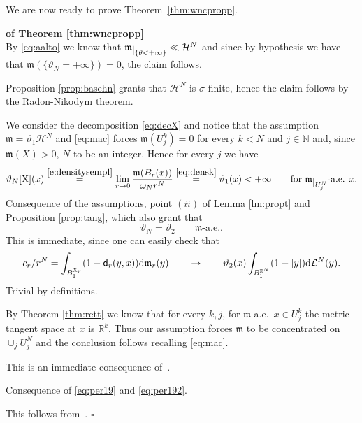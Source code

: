 \documentclass[reqno,11pt]{article}
\numberwithin{equation}{section}
\newcommand{\N}{\mathbb{N}}
\newcommand{\R}{\mathbb{R}}
\newcommand{\mm}{{\mbox{\boldmath$m$}}}
\newcommand{\sfd}{{\sf d}}
\renewcommand{\d}{{\mathrm d}}
\newcommand{\restr}[1]{\lower3pt\hbox{$|_{#1}$}}
\renewcommand{\mm}{\mathfrak m}                                %
\newenvironment{proofb}{\removelastskip\par\medskip   %
\noindent{\em{\bf Proof}} \rm}{\penalty-20\null\hfill$\square$\par\medbreak}
\newcommand{\X}{{\rm X}}
\newcommand{\HH}{{\mathcal H}}
\newcommand{\LL}{{\mathcal L}}
\begin{document}
We are now ready to prove Theorem~\ref{thm:wncpropp}.
\begin{proofb}{\bf of Theorem \ref{thm:wncpropp}}\\
 By \eqref{eq:aalto} we know that $\mm\restr{\{\theta<+\infty\}}\ll\HH^N$ and since by hypothesis we have that $\mm(\{\vartheta_N=+\infty\})=0$, the claim follows. 

 Proposition \ref{prop:basehn} grants that $\HH^N$ is $\sigma$-finite, hence the claim follows by the Radon-Nikodym theorem.

 We consider the decomposition \eqref{eq:decX} and notice that the assumption  \(\mm=\vartheta_1\HH^N\) and \eqref{eq:mac}  forces \(\mm(U^k_j)=0\) for every \(k<N\) and \(j\in \N\) and, since $\mm(X)>0$, \(N\) to be an integer. Hence for every $j$ we have
\begin{equation}
\label{eq:per19}
\vartheta_N[\X](x)\stackrel{\eqref{e:densitysempl}}=\lim_{r\to 0}\frac{\mm(B_r(x))}{\omega_Nr^N}\stackrel{\eqref{eq:densk}}=\vartheta_1(x)<+\infty\qquad\textrm{for \(\mm\restr{U_j^N}\)-a.e. \(x\)}.
\end{equation}
 Consequence of the assumptions, point $(ii)$ of Lemma \ref{lm:propt} and Proposition \ref{prop:tang}, which also grant that 
\begin{equation}
\label{eq:per192}
\vartheta_N=\vartheta_2\qquad \mm\textrm{-a.e.}.
\end{equation}
 This is immediate, since one can easily check that
\[
c_r/r^N=\int_{B_1^{\X_r}}(1-\sfd_r(y,x))\d \mm_r(y)\qquad\to\qquad{ \vartheta_2(x)} \int_{B_1^{\R^N}} (1-|y|)\d\LL^N(y). 
\]
  Trivial by definitions.

 By Theorem \ref{thm:rett} we know that for every $k,j$, for $\mm$-a.e.\ $x\in U^k_j$ the metric tangent space at $x$ is $\R^k$. Thus our assumption forces $\mm$ to be concentrated on $\cup_j U^N_j$ and the conclusion follows recalling \eqref{eq:mac}.

 This is an immediate consequence of~\cite[Theorem 5.1]{GP16}.

 Consequence of \eqref{eq:per19} and \eqref{eq:per192}.


 This follows from~\cite[Proposition 4.1]{Han14}.
\end{proofb}
\end{document}
